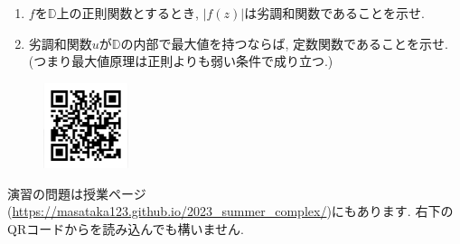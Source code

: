\documentclass[dvipdfmx,a4paper,11pt]{article}
\newcommand{\D}{\mathbb{D}}
\theoremstyle{definition}
\begin{document}
\begin{enumerate}[label=\textbf{問}7.\arabic*]
   \begin{enumerate}
 \setlength{\parskip}{0cm} 
  \setlength{\itemsep}{0cm} 
  \item $f$を$\D$上の正則関数とするとき, $ |f(z)|$は劣調和関数であることを示せ.  %
  \item 劣調和関数$u$が$\D$の内部で最大値を持つならば, 定数関数であることを示せ. (つまり最大値原理は正則よりも弱い条件で成り立つ.)
      \end{enumerate}  
   
  \end{enumerate} 
 

 
 \vspace{11pt}\begin{figure}  \centering\includegraphics[height=25mm, width=25mm]{complex.png}\end{figure}

演習の問題は授業ページ(\url{https://masataka123.github.io/2023_summer_complex/})にもあります. 右下のQRコードからを読み込んでも構いません.


  
  
 
\end{document}
